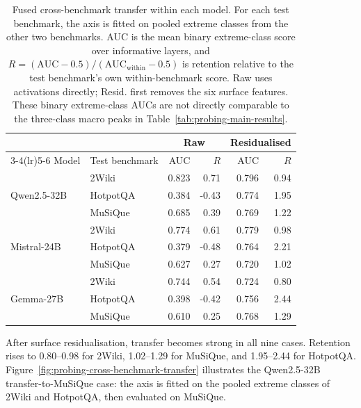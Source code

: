 \begin{table}[htbp]
  \centering
  \caption[Leave-one-benchmark-out transfer of the difficulty axis]{Fused
    cross-benchmark transfer within each model. For each test benchmark, the
    axis is fitted on pooled extreme classes from the other two benchmarks.
    AUC is the mean binary extreme-class score over informative layers, and
    \(R=(\mathrm{AUC}-0.5)/(\mathrm{AUC}_{\mathrm{within}}-0.5)\) is retention
    relative to the test benchmark's own within-benchmark score. Raw uses
    activations directly; Resid. first removes the six surface features. These
    binary extreme-class AUCs are not directly comparable to the three-class
    macro peaks in Table~\ref{tab:probing-main-results}.}
  \label{tab:probing-transfer-results}
  \begin{tabular}{llrrrr}
    \toprule
    & & \multicolumn{2}{c}{Raw} & \multicolumn{2}{c}{Residualised} \\
    \cmidrule(lr){3-4}\cmidrule(lr){5-6}
    Model & Test benchmark & AUC & \(R\) & AUC & \(R\) \\
    \midrule
    \multirow{3}{*}{Qwen2.5-32B}
      & 2Wiki    & 0.823 &  0.71 & 0.796 & 0.94 \\
      & HotpotQA & 0.384 & -0.43 & 0.774 & 1.95 \\
      & MuSiQue  & 0.685 &  0.39 & 0.769 & 1.22 \\
    \midrule
    \multirow{3}{*}{Mistral-24B}
      & 2Wiki    & 0.774 &  0.61 & 0.779 & 0.98 \\
      & HotpotQA & 0.379 & -0.48 & 0.764 & 2.21 \\
      & MuSiQue  & 0.627 &  0.27 & 0.720 & 1.02 \\
    \midrule
    \multirow{3}{*}{Gemma-27B}
      & 2Wiki    & 0.744 &  0.54 & 0.724 & 0.80 \\
      & HotpotQA & 0.398 & -0.42 & 0.756 & 2.44 \\
      & MuSiQue  & 0.610 &  0.25 & 0.768 & 1.29 \\
    \bottomrule
  \end{tabular}
\end{table}

After surface residualisation, transfer becomes strong in all nine cases.
Retention rises to 0.80--0.98 for 2Wiki, 1.02--1.29 for MuSiQue, and
1.95--2.44 for HotpotQA. Figure~\ref{fig:probing-cross-benchmark-transfer}
illustrates the Qwen2.5-32B transfer-to-MuSiQue case: the axis is fitted on the
pooled extreme classes of 2Wiki and HotpotQA, then evaluated on MuSiQue.

